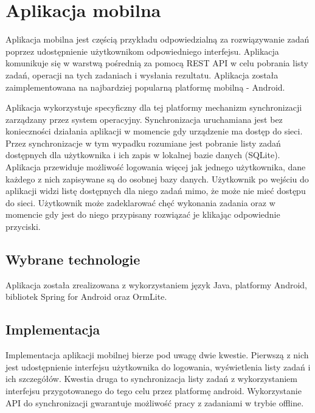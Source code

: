 
\section{Aplikacja mobilna}
\label{sec:exampleMobileApp}

Aplikacja mobilna jest częścią przykładu odpowiedzialną za rozwiązywanie zadań poprzez udostępnienie użytkownikom odpowiedniego interfejsu. Aplikacja komunikuje się w warstwą pośrednią za pomocą REST API w celu pobrania listy zadań, operacji na tych zadaniach i wysłania rezultatu. Aplikacja została zaimplementowana na najbardziej popularną platformę mobilną - Android. 

Aplikacja wykorzystuje specyficzny dla tej platformy mechanizm synchronizacji zarządzany przez system operacyjny. Synchronizacja uruchamiana jest bez konieczności działania aplikacji w momencie gdy urządzenie ma dostęp do sieci. Przez synchronizacje w tym wypadku rozumiane jest pobranie listy zadań dostępnych dla użytkownika i ich zapis w lokalnej bazie danych (SQLite). Aplikacja przewiduje możliwość logowania więcej jak jednego użytkownika, dane każdego z nich zapisywane są do osobnej bazy danych. Użytkownik po wejściu do aplikacji widzi listę dostępnych dla niego zadań mimo, że może nie mieć dostępu do sieci. Użytkownik może zadeklarować chęć wykonania zadania oraz w momencie gdy jest do niego przypisany rozwiązać je klikając odpowiednie przyciski.

\subsection{Wybrane technologie}

Aplikacja została zrealizowana z wykorzystaniem język Java, platformy Android, bibliotek Spring for Android oraz OrmLite. 

\subsection{Implementacja}

Implementacja aplikacji mobilnej bierze pod uwagę dwie kwestie. Pierwszą z nich jest udostępnienie interfejsu użytkownika do logowania, wyświetlenia listy zadań i ich szczegółów. Kwestia druga to synchronizacja listy zadań z wykorzystaniem interfejsu przygotowanego do tego celu przez platformę android. Wykorzystanie API do synchronizacji gwarantuje możliwość pracy z zadaniami w trybie offline. 

